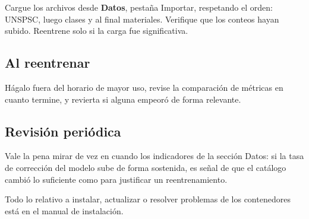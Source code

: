 Cargue los archivos desde \textbf{Datos}, pestaña Importar, respetando el orden:
UNSPSC, luego clases y al final materiales. Verifique que los conteos hayan
subido. Reentrene solo si la carga fue significativa.

\subsection{Al reentrenar}

Hágalo fuera del horario de mayor uso, revise la comparación de métricas en
cuanto termine, y revierta si alguna empeoró de forma relevante.

\subsection{Revisión periódica}

Vale la pena mirar de vez en cuando los indicadores de la sección Datos: si la
tasa de corrección del modelo sube de forma sostenida, es señal de que el
catálogo cambió lo suficiente como para justificar un reentrenamiento.

\vspace{1cm}

\begin{nota}
Todo lo relativo a instalar, actualizar o resolver problemas de los contenedores
está en el manual de instalación.
\end{nota}



